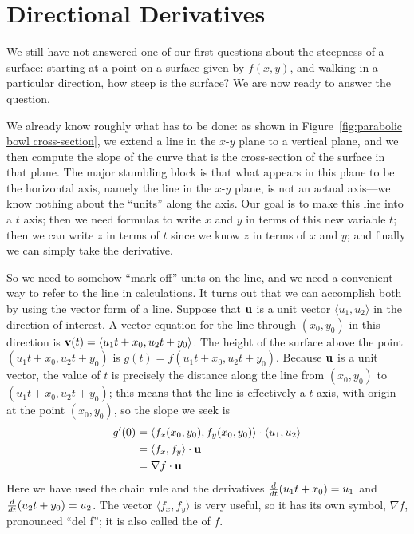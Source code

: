 \section{Directional Derivatives}\label{sec:DirectionalDerivatives}

We still have not answered one of our first questions about the
steepness of a surface: starting at a
point on a surface given by $f(x,y)$, and walking in a particular
direction, how steep is the surface? We are now ready to answer the
question.

We already know roughly what has to be done: as shown in
Figure~\ref{fig:parabolic bowl cross-section}, we extend a line in
the $x$-$y$ plane to a vertical plane, and we then compute the slope
of the curve that is the cross-section of the surface in that
plane. The major stumbling block is that what appears in this plane to
be the horizontal axis, namely the line in the $x$-$y$ plane, is not
an actual axis---we know nothing about the ``units'' along the
axis. Our goal is to make this line into a $t$ axis; then we need
formulas to write $x$ and $y$ in terms of this new variable $t$; then
we can write $z$ in terms of $t$ since we know $z$ in terms of $x$ and
$y$; and finally we can simply take the derivative.

So we need to somehow ``mark off'' units on the line, and we need a
convenient way to refer to the line in calculations. It turns out that
we can accomplish both by using the vector form of a line. Suppose
that ${\bf u}$ is a unit vector $\langle u_1,u_2\rangle$ in the
direction of interest. A vector equation for the line through
$(x_0,y_0)$ in this direction is ${\bf v}(t)=\langle
u_1t+x_0,u_2t+y_0\rangle$. The height of the surface above the point 
$(u_1t+x_0,u_2t+y_0)$ is $g(t)=f(u_1t+x_0,u_2t+y_0)$. Because $\bf u$
is a unit vector, the value of $t$ is precisely the distance along the
line from $(x_0,y_0)$ to $(u_1t+x_0,u_2t+y_0)$; this means that the
line is effectively a $t$ axis, with origin at the point $(x_0,y_0)$,
so the slope we seek is 
\begin{align*}
g'(0)&=\langle f_x(x_0,y_0),f_y(x_0,y_0)\rangle\cdot
\langle u_1,u_2\rangle	\\
&=\langle f_x,f_y\rangle\cdot{\bf u}	\\
&=\nabla f\cdot {\bf u}	\\
\end{align*}
Here we have used the chain rule and the derivatives
${d\over dt}(u_1t+x_0)=u_1$ and ${d\over dt}(u_2t+y_0)=u_2$.
The vector $\langle f_x,f_y\rangle$ is very useful, so it has its own
symbol, $\nabla f$, pronounced ``del f''; 
it is also called the
 of $f$.

